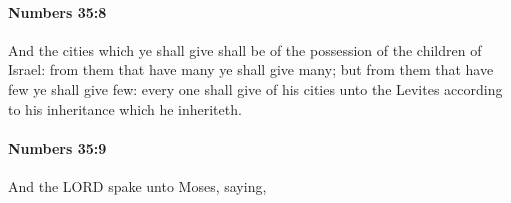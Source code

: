 		\paragraph{Numbers 35:8} %
			\label{NUMBERS-35-8}

			And the cities which ye shall give shall be of the possession of the children of Israel: from them that have many ye shall give many; but from them that have few ye shall give few: every one shall give of his cities unto the Levites according to his inheritance which he inheriteth.


		\paragraph{Numbers 35:9} %
			\label{NUMBERS-35-9}

			And the LORD spake unto Moses, saying,


